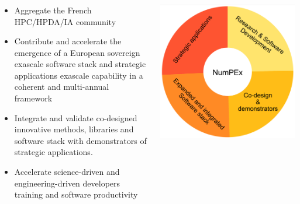 \begin{frame}
  \frametitle{\insertsectionhead}
  \framesubtitle{\insertsubsectionhead}
\footnotesize
  \begin{columns}
    \begin{column}{0.5\textwidth}
      \begin{itemize}
        \item \alert{Aggregate the French HPC/HPDA/IA}
        community
        \item Contribute and accelerate the emergence of a 
        \alert{European sovereign exascale software stack and strategic applications exascale capability in a coherent and multi-annual framework}
        \item Integrate and validate \alert{co-designed} innovative methods, libraries and software stack with demonstrators of strategic applications.
        \item Accelerate science-driven and engineering-driven developers \alert{training and software  productivity}
      \end{itemize}
    \end{column}
    \begin{column}{.5\textwidth}
      \includegraphics[width=\textwidth]{../figures/numpex-objectives.png}
    \end{column}
  \end{columns}

\end{frame}

